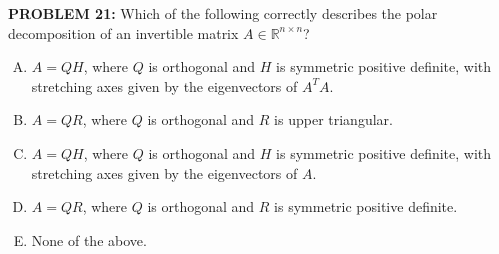 \documentclass[12pt]{amsart}
\begin{document}
{\bf PROBLEM 21:}
%
Which of the following correctly describes the polar decomposition of an invertible matrix $A \in \mathbb{R}^{n \times n}$?

\begin{enumerate}[(A)]
\item $A = QH$, where $Q$ is orthogonal and $H$ is symmetric positive definite, with stretching axes given by the eigenvectors of $A^TA$.
\item $A = QR$, where $Q$ is orthogonal and $R$ is upper triangular.
\item $A = QH$, where $Q$ is orthogonal and $H$ is symmetric positive definite, with stretching axes given by the eigenvectors of $A$.
\item $A = QR$, where $Q$ is orthogonal and $R$ is symmetric positive definite.
\item None of the above.
\end{enumerate}

%
%
\end{document}
